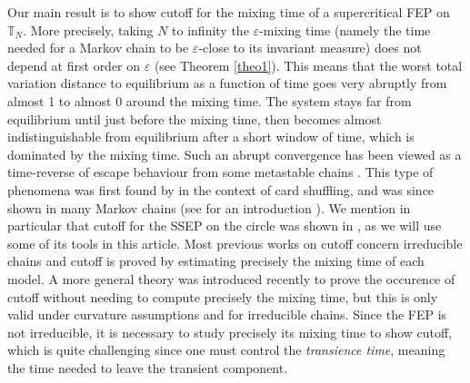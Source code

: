 \documentclass[11pt,a4paper]{article}
\newcommand{\T}{\mathbb{T}}
\begin{document}
Our main result is to show cutoff for the mixing time of a supercritical FEP on $\T_N$. More precisely, taking $N$ to infinity the $\varepsilon$-mixing time (namely the time needed for a Markov chain to be $\varepsilon$-close to its invariant measure) does not depend  at first order on $\varepsilon$ (see Theorem \ref{theo1}).
This means that the worst total variation distance to equilibrium as a function of time goes very abruptly from almost 1 to almost 0 around the mixing time. The system stays far from equilibrium until just before the mixing time, then becomes almost indistinguishable from equilibrium after a short window of time, which is dominated by the mixing time. Such an abrupt convergence has been viewed as a time-reverse of escape behaviour from some metastable chains \cite{barrera_abrupt_2009}.
This type of phenomena was first found by \cite{diaconis_generating_1981,aldous_shuffling_1986} in the context of card shuffling, and was since shown in many Markov chains (see for an introduction \cite[Chapter 18]{levin_markov_2017}). We mention in particular that cutoff for the SSEP on the circle was shown in \cite{lacoin_simple_2017}, as we will use some of its tools in this article. 
Most previous works on cutoff concern irreducible chains and cutoff is proved by estimating precisely the mixing time of each model. 
A more general theory was introduced recently \cite{salez_cutoff_2023,salez_modern_2025} to prove the occurence of cutoff without needing to compute precisely the mixing time, but this is only valid under curvature assumptions and for irreducible chains. Since the FEP is not irreducible, it is necessary to study precisely its mixing time to show cutoff, which is quite challenging since one must control the \emph{transience time}, meaning the time needed to leave the transient component.
\end{document}
